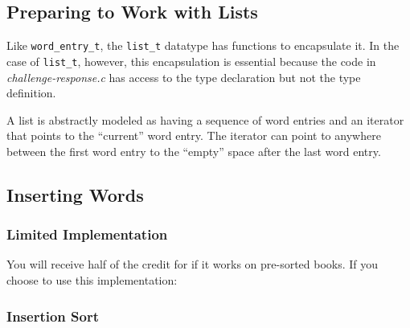 \subsection{Preparing to Work with Lists}

    Like \lstinline{word_entry_t}, the \lstinline{list_t} datatype has functions to encapsulate it.
    In the case of \lstinline{list_t}, however, this encapsulation is essential because the code in \textit{challenge-response.c} has access to the type declaration but not the type definition.

    \begin{description}
    \end{description}

    A list is abstractly modeled as having a sequence of word entries and an iterator that points to the ``current'' word entry.
    The iterator can point to anywhere between the first word entry to the ``empty'' space after the last word entry.

    \begin{description}
    \end{description}


\subsection{Inserting Words}

    \subsubsection{Limited Implementation}

        You will receive half of the credit for  if it works on pre-sorted books.
        If you choose to use this implementation:
        \begin{description}
        \end{description}

    \subsubsection{Insertion Sort}

